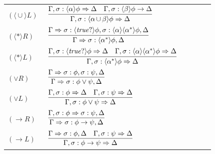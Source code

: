 \documentclass[manuscript,screen]{acmart}
\newcommand{\la}[0]{\langle}
\newcommand{\ra}[0]{\rangle}
\newcommand{\true}[0]{\mathit{true}}
\DeclareMathOperator{\seq}{;}
\DeclareMathOperator{\cho}{\cup}
\newcommand{\lup}[0]{*}
\newcommand{\cat}[0]{\diamond}
\DeclareMathOperator{\osuf}{\mathbf{suf}}
\begin{document}
\begin{table}[t]
\begin{tabular}{p{0.18\linewidth}p{0.74\linewidth}}
$(\la\cho\ra L)$ & $\begin{aligned}\infer[]{\Gamma, \sigma:\la\alpha\cho\beta\ra\phi\Rightarrow \Delta}{\Gamma, \sigma:\la\alpha\ra\phi\Rightarrow \Delta & \Gamma, \sigma:\la\beta\ra\phi\rightarrow\Delta}\end{aligned}$\\[1.2em]
$(\la\lup\ra R)$ & $\begin{aligned}\infer[]{\Gamma\Rightarrow \sigma:\la\alpha^\lup\ra\phi, \Delta}{\Gamma\Rightarrow \sigma:\la\true?\ra\phi , \sigma : \la\alpha\ra\la\alpha^\lup\ra\phi, \Delta}\end{aligned}$\\[1.2em]
$(\la\lup\ra L)$ & $\begin{aligned}\infer[]{\Gamma, \sigma:\la\alpha^\lup\ra\phi\Rightarrow \Delta}{\Gamma, \sigma:\la\true?\ra\phi\Rightarrow \Delta & \Gamma, \sigma : \la\alpha\ra\la\alpha^\lup\ra\phi\Rightarrow \Delta}\end{aligned}$\\[1.2em]
$(\vee R)$ & $\begin{aligned}\infer[]{\Gamma\Rightarrow\sigma:\phi\vee\psi,\Delta}{\Gamma\Rightarrow\sigma:\phi,\sigma:\psi,\Delta}\end{aligned}$\\[1.2em]
$(\vee L)$ & $\begin{aligned}\infer[]{\Gamma,\sigma:\phi\vee\psi\Rightarrow\Delta}{\Gamma,\sigma:\phi\Rightarrow\Delta & \Gamma,\sigma:\psi\Rightarrow\Delta}\end{aligned}$\\[1.2em]
$(\to R)$ & $\begin{aligned}\infer[]{\Gamma\Rightarrow\sigma:\phi\to\psi,\Delta}{\Gamma,\sigma:\phi\Rightarrow\sigma:\psi,\Delta}\end{aligned}$\\[1.2em]
$(\to L)$ & $\begin{aligned}\infer[]{\Gamma,\sigma:\phi\to\psi\Rightarrow\Delta}{\Gamma\Rightarrow\sigma:\phi,\Delta & \Gamma,\sigma:\psi\Rightarrow\Delta}\end{aligned}$\\[1.2em]

\end{tabular}
\end{table}
\end{document}
